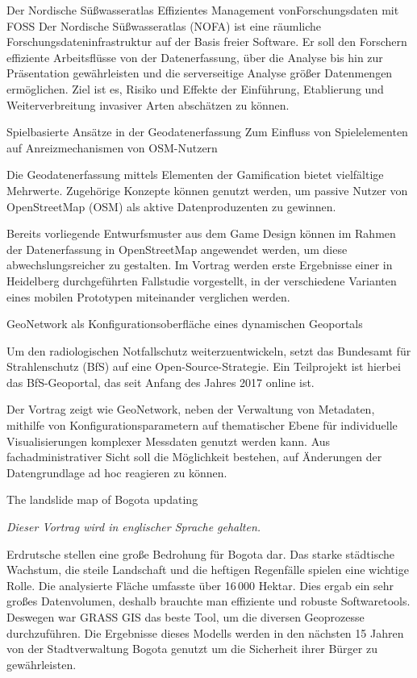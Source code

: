%
{Der Nordische Süßwasseratlas}%
{Effizientes Management von\linebreak Forschungsdaten mit FOSS}%
{%
Der Nordische Süßwasseratlas (NOFA) ist eine räumliche
Forschungsdateninfrastruktur auf der Basis freier Software.
Er soll den Forschern effiziente Arbeitsflüsse von der Datenerfassung, über
die Analyse bis hin zur Präsentation gewährleisten und die serverseitige
Analyse größer Datenmengen ermöglichen. Ziel ist es, Risiko und Effekte der
Einführung, Etablierung und Weiterverbreitung invasiver Arten abschätzen zu
können.%
}

%
{Spielbasierte Ansätze in der Geodatenerfassung}%
{Zum Einfluss von Spielelementen auf \mbox{Anreizmechanismen} von OSM-Nutzern}%
{%
Die Geodatenerfassung mittels Elementen der Gamification bietet vielfältige
Mehrwerte. Zugehörige Konzepte können genutzt werden, um passive Nutzer von
OpenStreetMap (OSM) als aktive Datenproduzenten zu gewinnen.

Bereits vorliegende Entwurfsmuster aus dem Game Design können im Rahmen der
Datenerfassung in OpenStreetMap angewendet werden, um diese abwechslungsreicher zu
gestalten. Im Vortrag werden erste Ergebnisse einer in Heidelberg
durchgeführten Fallstudie vorgestellt, in der verschiedene Varianten eines
mobilen Prototypen miteinander verglichen werden.%
}

%
{GeoNetwork als Konfigurationsoberfläche eines dynamischen Geoportals}%
{}%
{%
Um den radiologischen Notfallschutz weiterzuentwickeln, setzt das Bundesamt für
Strahlenschutz (BfS) auf eine Open-Source-Strategie. Ein Teilprojekt ist
hierbei das BfS-Geoportal, das seit Anfang des Jahres 2017 online ist.

Der Vortrag zeigt wie GeoNetwork, neben der Verwaltung von Metadaten, mithilfe
von Konfigurationsparametern auf thematischer Ebene für individuelle
Visualisierungen komplexer Messdaten genutzt werden kann. Aus
fachadministrativer Sicht soll die Möglichkeit bestehen, auf Änderungen der
Datengrundlage ad hoc reagieren zu können.%
}

%
{The landslide map of Bogota updating}%
{}%
{%
  \emph{Dieser Vortrag wird in englischer Sprache gehalten.}

  \begin{otherlanguage}{english}
    Erdrutsche stellen eine große Bedrohung für Bogota dar. Das starke städtische
    Wachstum, die steile Landschaft und die heftigen Regenfälle spielen eine
    wichtige Rolle. Die analysierte Fläche umfasste über 16\,000 Hektar. Dies ergab
    ein sehr großes Datenvolumen, deshalb brauchte man effiziente und robuste
    Softwaretools. Des\-wegen war GRASS GIS das beste Tool, um die diversen
    Geoprozesse durchzuführen. Die Ergebnisse dieses Modells werden in den nächsten
    15 Jahren von der Stadtverwaltung Bogota genutzt um die Sicherheit ihrer Bürger
    zu gewährleisten.%
  \end{otherlanguage}
}

